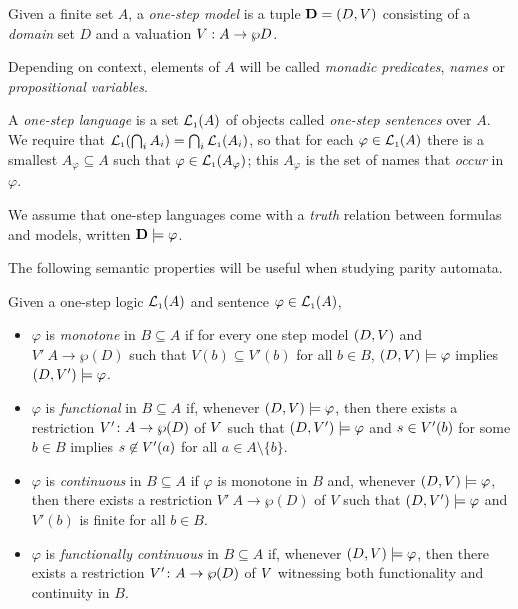 

\begin{definition}
Given a finite set $A$, a \emph{one-step model} is a tuple $\mathbf{D} = (D,V)$
consisting of a \emph{domain} set $D$ and a valuation $V: A \to \wp D$.

Depending on context, elements of $A$ will be called \emph{monadic predicates}, \emph{names}
or \emph{propositional variables}.

A \emph{one-step language} is a set $\mathcal{L}_{\scriptscriptstyle 1}(A)$ of objects called \emph{one-step sentences} over $A$. 
We require that $\mathcal{L}_{\scriptscriptstyle 1}(\bigcap_{i} A_{i}) = \bigcap_{i} \mathcal{L}_{\scriptscriptstyle 1}(A_{i})$,
so that for each $\varphi \in \mathcal{L}_{\scriptscriptstyle 1}(A)$ there is a smallest $A_{\varphi} \subseteq A$ such
that $\varphi \in \mathcal{L}_{\scriptscriptstyle 1}(A_{\varphi})$; this $A_{\varphi}$ is the set of names that \emph{occur} in $\varphi$.

We assume that one-step languages come with a \emph{truth}
relation between formulas and models, written $\mathbf{D} \models \varphi$.
\end{definition}

The following semantic properties will be useful when studying parity automata.

\begin{definition}\label{def:functionalsentenceofoe} Given a one-step logic $\mathcal{L}_{\scriptscriptstyle 1}(A)$ and sentence $\varphi \in \mathcal{L}_{\scriptscriptstyle 1}(A)$,
\begin{itemize}
\item $\varphi$ is \emph{monotone} in $B \subseteq A$ if for every one step model $(D,V)$ and $V' \: A \to \wp(D)$ such that $V(b) \subseteq V'(b)$ for all $b \in B$, $(D,V) \models \varphi$ implies $(D,V') \models \varphi$.
\item $\varphi$ is \emph{functional} in $B\subseteq A$ if, whenever $(D,V) \models \varphi$, then there exists a restriction $V' \colon A \to \wp(D)$ of $V$ such that $(D,V') \models \varphi$ and $s \in V'(b)$ for some $b \in B$ implies $s \not\in V'(a)$ for all $a \in A\setminus\{b\}$.
\item $\varphi$ is \emph{continuous} in $B \subseteq A$ if $\varphi$ is monotone in $B$ and, whenever $(D,V) \models \varphi$, then there exists a restriction $V' \: A \to \wp(D)$ of $V$ such that $(D,V') \models \varphi$ and $V'(b)$ is finite for all $b \in B$.
\item $\varphi$ is \emph{functionally continuous} in $B \subseteq A$ if, whenever $(D,V) \models \varphi$, then there exists a restriction $V' \colon A \to \wp(D)$ of $V$ witnessing both functionality and continuity in $B$.
\end{itemize}
\end{definition}


